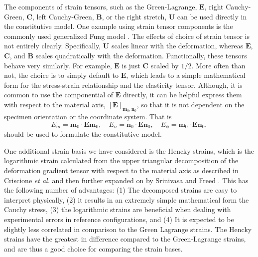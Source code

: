 	The components of strain tensors, such as the Green-Lagrange, $\mathbf{E}$, right Cauchy-Green, $\mathbf{C}$, left Cauchy-Green, $\mathbf{B}$, or the right stretch, $\mathbf{U}$ can be used directly in the constitutive model. One example using strain tensor components is the commonly used generalized Fung model \cite{fung_biomechanics_1993}. The effects of choice of strain tensor is not entirely clearly. Specifically, $\mathbf{U}$ scales linear with the deformation, whereas $\mathbf{E}$, $\mathbf{C}$, and $\mathbf{B}$ scales quadratically with the deformation. Functionally, these tensors behave very similarly. For example, $\mathbf{E}$ is just $\mathbf{C}$ scaled by $1/2$. More often than not, the choice is to simply default to $\mathbf{E}$, which leads to a simple mathematical form for the stress-strain relationship and the elasticity tensor. Although, it is common to use the componential of $\mathbf{E}$ directly, it can be helpful express them with respect to the material axis, $\left[\mathbf{E}\right]_{\mathbf{m}_0,\mathbf{n}_0}$, so that it is not dependent on the specimen orientation or the coordinate system. That is 
\begin{equation} \label{eqn:greenstrain}
E_m = \mathbf{m}_0\cdot\mathbf{E}\mathbf{m}_0, \quad E_n = \mathbf{n}_0\cdot\mathbf{E}\mathbf{n}_0, \quad E_{\phi} = \mathbf{m}_0\cdot\mathbf{E}\mathbf{n}_0,
\end{equation} 
should be used to formulate the constitutive model.


    One additional strain basis we have considered is the Hencky strains, which is the logarithmic strain calculated from the upper triangular decomposition of the deformation gradient tensor with respect to the material axis as described in Criscione \textit{et al.} \cite{criscione_experimentally_2003a} and then further expanded on by Srinivasa \cite{srinivasa_use_2012} and Freed \cite{freed_logarithmic_2015, freed_conjugate_2017, erel_stress/strain_2017}. This has the following number of advantages: (1) The decomposed strains are easy to interpret physically, (2) it results in an extremely simple mathematical form the Cauchy stress, (3) the logarithmic strains are beneficial when dealing with experimental errors in reference configurations, and (4) It is expected to be slightly less correlated in comparison to the Green Lagrange strains. The Hencky strains have the greatest in difference compared to the Green-Lagrange strains, and are thus a good choice for comparing the strain bases.
    
